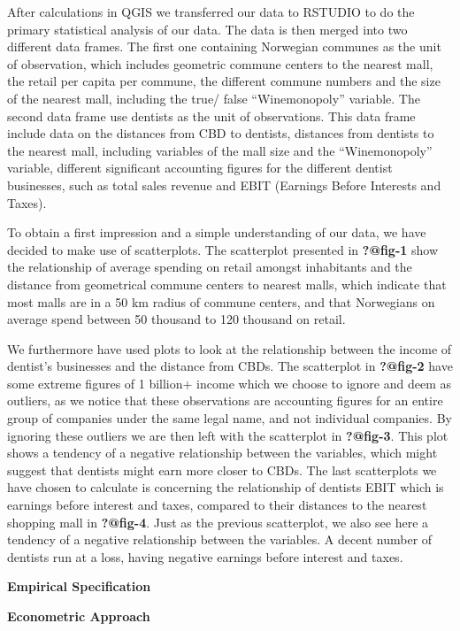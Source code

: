 \documentclass[
  10,
  a4paper,
]{article}
\begin{document}
After calculations in QGIS we transferred our data to RSTUDIO to do the
primary statistical analysis of our data. The data is then merged into
two different data frames. The first one containing Norwegian communes
as the unit of observation, which includes geometric commune centers to
the nearest mall, the retail per capita per commune, the different
commune numbers and the size of the nearest mall, including the true/
false ``Winemonopoly'' variable. The second data frame use dentists as
the unit of observations. This data frame include data on the distances
from CBD to dentists, distances from dentists to the nearest mall,
including variables of the mall size and the ``Winemonopoly'' variable,
different significant accounting figures for the different dentist
businesses, such as total sales revenue and EBIT (Earnings Before
Interests and Taxes).

To obtain a first impression and a simple understanding of our data, we
have decided to make use of scatterplots. The scatterplot presented in
\textbf{?@fig-1} show the relationship of average spending on retail
amongst inhabitants and the distance from geometrical commune centers to
nearest malls, which indicate that most malls are in a 50 km radius of
commune centers, and that Norwegians on average spend between 50
thousand to 120 thousand on retail.

We furthermore have used plots to look at the relationship between the
income of dentist's businesses and the distance from CBDs. The
scatterplot in \textbf{?@fig-2} have some extreme figures of 1 billion+
income which we choose to ignore and deem as outliers, as we notice that
these observations are accounting figures for an entire group of
companies under the same legal name, and not individual companies. By
ignoring these outliers we are then left with the scatterplot in
\textbf{?@fig-3}. This plot shows a tendency of a negative relationship
between the variables, which might suggest that dentists might earn more
closer to CBDs. The last scatterplots we have chosen to calculate is
concerning the relationship of dentists EBIT which is earnings before
interest and taxes, compared to their distances to the nearest shopping
mall in \textbf{?@fig-4}. Just as the previous scatterplot, we also see
here a tendency of a negative relationship between the variables. A
decent number of dentists run at a loss, having negative earnings before
interest and taxes.

\textbf{Empirical Specification}

\textbf{Econometric Approach}
\end{document}

